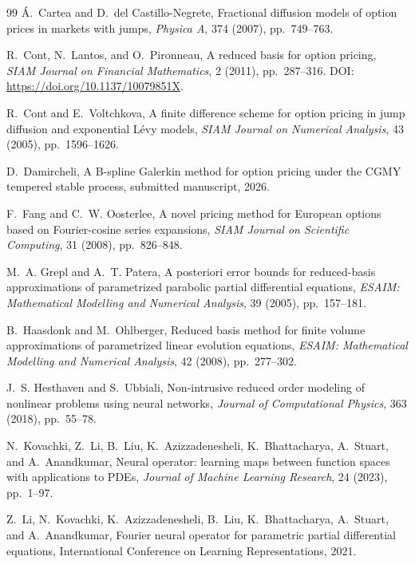 \begin{thebibliography}{99}
\'A.~Cartea and D.~del Castillo-Negrete,
\newblock Fractional diffusion models of option prices in markets with jumps,
\newblock \emph{Physica A}, 374 (2007), pp.~749--763.

R.~Cont, N.~Lantos, and O.~Pironneau,
\newblock A reduced basis for option pricing,
\newblock \emph{SIAM Journal on Financial Mathematics}, 2 (2011),
pp.~287--316. DOI: \url{https://doi.org/10.1137/10079851X}.

R.~Cont and E.~Voltchkova,
\newblock A finite difference scheme for option pricing in jump diffusion and
exponential L\'evy models,
\newblock \emph{SIAM Journal on Numerical Analysis}, 43 (2005),
pp.~1596--1626.

D.~Damircheli,
\newblock A B-spline Galerkin method for option pricing under the CGMY
tempered stable process,
\newblock submitted manuscript, 2026.

F.~Fang and C.~W. Oosterlee,
\newblock A novel pricing method for European options based on Fourier-cosine
series expansions,
\newblock \emph{SIAM Journal on Scientific Computing}, 31 (2008),
pp.~826--848.

M.~A. Grepl and A.~T. Patera,
\newblock A posteriori error bounds for reduced-basis approximations of
parametrized parabolic partial differential equations,
\newblock \emph{ESAIM: Mathematical Modelling and Numerical Analysis},
39 (2005), pp.~157--181.

B.~Haasdonk and M.~Ohlberger,
\newblock Reduced basis method for finite volume approximations of
parametrized linear evolution equations,
\newblock \emph{ESAIM: Mathematical Modelling and Numerical Analysis},
42 (2008), pp.~277--302.

J.~S. Hesthaven and S.~Ubbiali,
\newblock Non-intrusive reduced order modeling of nonlinear problems using
neural networks,
\newblock \emph{Journal of Computational Physics}, 363 (2018), pp.~55--78.

N.~Kovachki, Z.~Li, B.~Liu, K.~Azizzadenesheli, K.~Bhattacharya, A.~Stuart,
and A.~Anandkumar,
\newblock Neural operator: learning maps between function spaces with
applications to PDEs,
\newblock \emph{Journal of Machine Learning Research}, 24 (2023), pp.~1--97.

Z.~Li, N.~Kovachki, K.~Azizzadenesheli, B.~Liu, K.~Bhattacharya, A.~Stuart,
and A.~Anandkumar,
\newblock Fourier neural operator for parametric partial differential
equations,
\newblock International Conference on Learning Representations, 2021.


\end{thebibliography}
